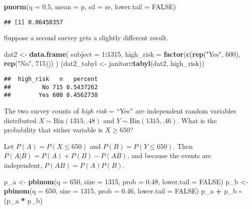 \documentclass[
]{book}
\newenvironment{Shaded}{\begin{snugshade}}{\end{snugshade}}
\newcommand{\DataTypeTok}[1]{\textcolor[rgb]{0.13,0.29,0.53}{#1}}
\newcommand{\DecValTok}[1]{\textcolor[rgb]{0.00,0.00,0.81}{#1}}
\newcommand{\FloatTok}[1]{\textcolor[rgb]{0.00,0.00,0.81}{#1}}
\newcommand{\KeywordTok}[1]{\textcolor[rgb]{0.13,0.29,0.53}{\textbf{#1}}}
\newcommand{\NormalTok}[1]{#1}
\newcommand{\OperatorTok}[1]{\textcolor[rgb]{0.81,0.36,0.00}{\textbf{#1}}}
\newcommand{\OtherTok}[1]{\textcolor[rgb]{0.56,0.35,0.01}{#1}}
\newcommand{\StringTok}[1]{\textcolor[rgb]{0.31,0.60,0.02}{#1}}
\begin{document}
\begin{Shaded}
\begin{Highlighting}[]
\KeywordTok{pnorm}\NormalTok{(}\DataTypeTok{q =} \FloatTok{0.5}\NormalTok{, }\DataTypeTok{mean =}\NormalTok{ p, }\DataTypeTok{sd =}\NormalTok{ se, }\DataTypeTok{lower.tail =} \OtherTok{FALSE}\NormalTok{)}
\end{Highlighting}
\end{Shaded}

\begin{verbatim}
## [1] 0.06450357
\end{verbatim}

Suppose a second survey gets a slightly different result.

\begin{Shaded}
\begin{Highlighting}[]
\NormalTok{dat2 <-}\StringTok{ }\KeywordTok{data.frame}\NormalTok{(}
  \DataTypeTok{subject =} \DecValTok{1}\OperatorTok{:}\DecValTok{1315}\NormalTok{,}
  \DataTypeTok{high_risk =} \KeywordTok{factor}\NormalTok{(}\KeywordTok{c}\NormalTok{(}\KeywordTok{rep}\NormalTok{(}\StringTok{"Yes"}\NormalTok{, }\DecValTok{600}\NormalTok{), }\KeywordTok{rep}\NormalTok{(}\StringTok{"No"}\NormalTok{, }\DecValTok{715}\NormalTok{)))}
\NormalTok{)}
\NormalTok{(dat2_tabyl <-}\StringTok{ }\NormalTok{janitor}\OperatorTok{::}\KeywordTok{tabyl}\NormalTok{(dat2, high_risk))}
\end{Highlighting}
\end{Shaded}

\begin{verbatim}
##  high_risk   n   percent
##         No 715 0.5437262
##        Yes 600 0.4562738
\end{verbatim}

The two survey counts of \emph{high risk} = ``Yes'' are independent random variables distributed \(X \sim \mathrm{Bin}(1315, .48)\) and \(Y \sim \mathrm{Bin}(1315, .46)\). What is the probability that either variable is \(X \ge 650\)?

Let \(P(A) = P(X \le 650)\) and \(P(B) = P(Y \le 650)\). Then \(P(A|B) = P(A) + P(B) - P(AB)\), and because the events are independent, \(P(AB) = P(A)P(B)\).

\begin{Shaded}
\begin{Highlighting}[]
\NormalTok{p_a <-}\StringTok{ }\KeywordTok{pbinom}\NormalTok{(}\DataTypeTok{q =} \DecValTok{650}\NormalTok{, }\DataTypeTok{size =} \DecValTok{1315}\NormalTok{, }\DataTypeTok{prob =} \FloatTok{0.48}\NormalTok{, }\DataTypeTok{lower.tail =} \OtherTok{FALSE}\NormalTok{)}
\NormalTok{p_b <-}\StringTok{ }\KeywordTok{pbinom}\NormalTok{(}\DataTypeTok{q =} \DecValTok{650}\NormalTok{, }\DataTypeTok{size =} \DecValTok{1315}\NormalTok{, }\DataTypeTok{prob =} \FloatTok{0.46}\NormalTok{, }\DataTypeTok{lower.tail =} \OtherTok{FALSE}\NormalTok{)}
\NormalTok{p_a }\OperatorTok{+}\StringTok{ }\NormalTok{p_b }\OperatorTok{-}\StringTok{ }\NormalTok{(p_a }\OperatorTok{*}\StringTok{ }\NormalTok{p_b)}
\end{Highlighting}
\end{Shaded}
\end{document}
